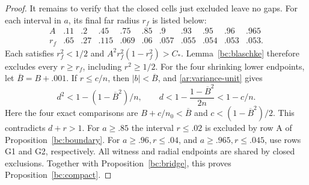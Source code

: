 \begin{proof}
It remains to verify that the closed cells just excluded leave no
gaps.  For each interval in $a$, its final far radius $r_f$ is listed
below:
\begin{equation}\label{bc:far-table}
\begin{array}{c|rrrrrrrrrr}
 A&.11&.2&.45&.75&.85&.9&.93&.95&.96&.965\\ \hline
 r_f&.65&.27&.115&.069&.06&.057&.055&.054&.053&.053.
\end{array}
\end{equation}
Each satisfies $r_f^2<1/2$ and
$A^2r_f^2(1-r_f^2)>C_*$.  Lemma~\ref{bc:blaschke} therefore
excludes every $r\geq r_f$, including $r^2\geq1/2$.
For the four shrinking lower endpoints, let
$\overline B=B+.001$.  If $r\leq c/n$, then $|b|<\overline B$,
and \eqref{ar:variance-unit} gives
\[
 d^2<1-(1-\overline B^2)/n,\qquad
 d<1-\frac{1-\overline B^2}{2n}<1-c/n.
\]
Here the four exact comparisons are $B+c/n_0<\overline B$ and
$c<(1-\overline B^2)/2$.
This contradicts $d+r>1$.
For $a\geq.85$ the interval $r\leq.02$ is excluded by row A of
Proposition~\ref{bc:boundary}.  For $a\geq.96,r\leq.04$, and
$a\geq.965,r\leq.045$, use rows G1 and G2, respectively.
All witness and radial endpoints are shared by closed exclusions.
Together with Proposition~\ref{bc:bridge}, this proves
Proposition~\ref{bc:compact}.
\end{proof}

